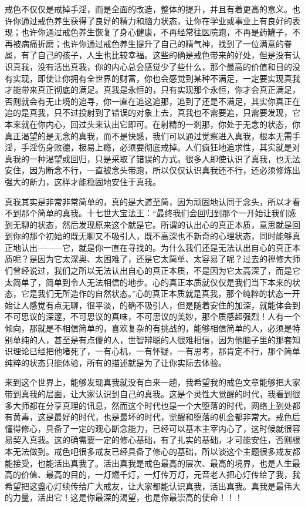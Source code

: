 戒色不仅仅是戒掉手淫，而是全面的改造，整体的提升，并且有着更高的意义。也许你通过戒色养生获得了良好的精力和脑力状态，让你在学业或事业上有良好的表现；也许你通过戒色养生恢复了身心健康，不再经常往医院跑，不再是药罐子，不再被病痛折磨；也许你通过戒色养生提升了自己的精气神，找到了一位满意的眷属，有了自己的孩子，人生也比较幸福。这些的确是戒色带来的好处，但是没有认识真我，没有活出真我，你的内心总会感觉少了些什么，那个最高的价值和目的没有实现，即使让你拥有全世界的财富，你也会感觉到某种不满足，一定要实现真我才能带来真正彻底的满足。真我是永恒的，只有实现那个永恒，你才会真正满足，否则就会有无止境的追寻，你一直在追这追那，追到了还是不满足，其实你真正在追的是真我，只不过投射到了错误的对象上去，真我也不需要追，只需要发现，它本来就在你内心，回过头来认出它即可。在射精的一刹那，你处于无念的状态，你真正渴望的是无念的真我，而不是快感，我们可以通过觉察进入真我，根本无需手淫，手淫伤身败德，极易上瘾，必须要彻底戒掉。人们疯狂地追求性，其实就是对真我的一种渴望或回归，只是采取了错误的方式。很多人即使认识了真我，也无法安住，因为断念不行，一直被念头带跑，所以仅仅认识真我还不行，还必须修炼出强大的断力，这样才能稳固地安住于真我。

真我其实是非常非常简单的，真的是大道至简，因为顽固地认同于念头，所以才看不到那个简单的真我。十七世大宝法王：“最终我们会回归到那个一开始让我们感到无聊的状态，然后发现原来这个就是它。所谓的认出心的真正本质，意思就是回到你的那个初始的既无聊又不吸引人，既不高深也不新奇的心理状态，同时能够真正地认出———它，就是你一直在寻找的。为什么我们还是无法认出自心的真正本质呢？是因为它太深奥、太困难了，还是它太简单、太容易了呢？过去的禅修大师们曾经说过，我们之所以无法认出自心的真正本质，不是因为它太高深了，而是它太简单了，简单到令人无法相信的地步。心的真正本质就仅仅是我们当下本来的状态，它是我们无所造作的自然状态。”心的真正本质就是真我，那个纯粹的状态一开始让人感觉有点无聊，很平淡，的确不吸引人，但是随着安住的加深，就能体会到不可思议的深邃，不可思议的真味，不可思议的美妙，那个质感超强烈！人有一个倾向，那就是不相信简单的，喜欢复杂的有挑战的，能够相信简单的人，必须是特别单纯的人，甚至是有点傻的人，世智辩聪的人很难相信，因为他脑子里的那套知识理论已经把他堵死了，一有心机，一有怀疑，一有思考，那肯定不行，那个简单纯粹的状态只能体验，所有的描述就是为了让你实际去体验。

来到这个世界上，能够发现真我就没有白来一趟，我希望我的戒色文章能够把大家带到真我的层面，让大家认识到自己的真我。这是个灵性大觉醒的时代，我看到很多大师都在分享真理的讯息，然而这个时代也是一个大堕落的时代，网络上到处都有黄毒，这是最好的时代，也是最坏的时代，觉醒和堕落的机会都非常大。戒色后懂得修心，具备了一定的观心断念能力，已经可以基本主宰内心了，这时候就很容易契入真我。这的确需要一定的修心基础，有了扎实的基础，才可能安住，否则根本无法做到。戒色吧很多戒友已经具备了修心的基础，所以谈这个主题很多戒友都能接受，也能活出真我了。活出真我是戒色最高的层次、最高的境界，也是人生最高的价值、最高的目的，一灯燃千灯，一灯传万灯，元音老人把心灯传给了我，我希望把这盏心灯续传给广大戒友，让大家都能认识真我，活出真我。真我是最伟大的力量，活出它！这是你最深的渴望，也是你最崇高的使命！！！


